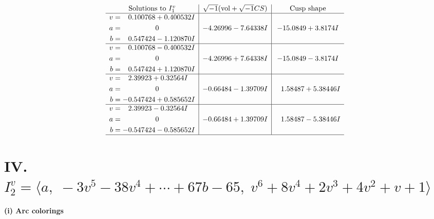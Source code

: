 \documentclass[1p]{elsarticle_modified}
\theoremstyle{definition}
\newcommand{\I}{\sqrt{-1}}
\begin{document}
$$\begin{array}{c|c|c}  
\text{Solutions to }I^v_{1}& \I (\text{vol} + \sqrt{-1}CS) & \text{Cusp shape}\\
 \hline 
\begin{aligned}
v &= \phantom{-}0.100768 + 0.400532 I \\
a &= \phantom{-0.000000 } 0 \\
b &= \phantom{-}0.547424 - 1.120870 I\end{aligned}
 & -4.26996 - 7.64338 I & -15.0849 + 3.8174 I \\ \hline\begin{aligned}
v &= \phantom{-}0.100768 - 0.400532 I \\
a &= \phantom{-0.000000 } 0 \\
b &= \phantom{-}0.547424 + 1.120870 I\end{aligned}
 & -4.26996 + 7.64338 I & -15.0849 - 3.8174 I \\ \hline\begin{aligned}
v &= \phantom{-}2.39923 + 0.32564 I \\
a &= \phantom{-0.000000 } 0 \\
b &= -0.547424 + 0.585652 I\end{aligned}
 & -0.66484 - 1.39709 I & \phantom{-}1.58487 + 5.38446 I \\ \hline\begin{aligned}
v &= \phantom{-}2.39923 - 0.32564 I \\
a &= \phantom{-0.000000 } 0 \\
b &= -0.547424 - 0.585652 I\end{aligned}
 & -0.66484 + 1.39709 I & \phantom{-}1.58487 - 5.38446 I\\
 \hline 
 \end{array}$$\newpage\newpage\renewcommand{\arraystretch}{1}
\centering \section*{IV. $I^v_{2}= \langle a,\;-3 v^5-38 v^4+\cdots+67 b-65,\;v^6+8 v^4+2 v^3+4 v^2+v+1 \rangle$}
\flushleft \textbf{(i) Arc colorings}\\
\end{document}
